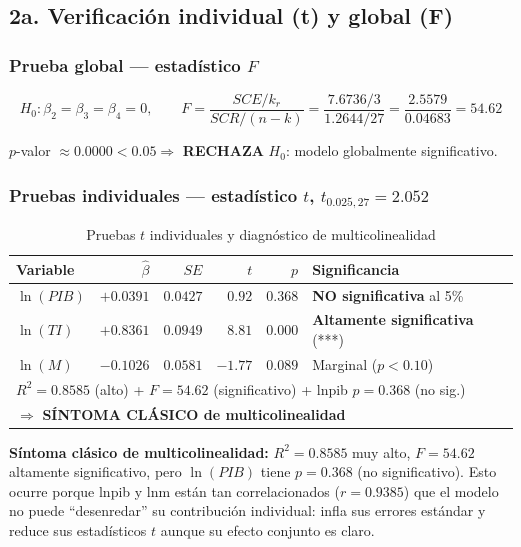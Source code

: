 \documentclass[12pt,a4paper]{article}
\begin{document}
\subsection{2a. Verificación individual (t) y global (F)}

\subsubsection{Prueba global --- estadístico $F$}

\[H_0:\beta_2=\beta_3=\beta_4=0,\qquad
F=\frac{SCE/k_r}{SCR/(n-k)}=\frac{7.6736/3}{1.2644/27}=\frac{2.5579}{0.04683}=\mathbf{54.62}\]

$p$-valor $\approx 0.0000 < 0.05 \Rightarrow$ \textbf{RECHAZA} $H_0$: modelo globalmente significativo.

\subsubsection{Pruebas individuales --- estadístico $t$, $t_{0.025,27}=2.052$}

\begin{table}[H]\centering
\caption{Pruebas $t$ individuales y diagnóstico de multicolinealidad}
\begin{tabular}{lrrrrl}
\toprule
\textbf{Variable} & $\hat\beta$ & $SE$ & $t$ & $p$ & \textbf{Significancia}\\
\midrule
$\ln(PIB)$ & $+0.0391$ & $0.0427$ & $0.92$ & $0.368$ &
  \textcolor{rojo_a}{\textbf{NO significativa}} al 5\%\\
$\ln(TI)$  & $+0.8361$ & $0.0949$ & $8.81$ & $0.000$ &
  \textcolor{verde_o}{\textbf{Altamente significativa}} (***)\\
$\ln(M)$   & $-0.1026$ & $0.0581$ & $-1.77$ & $0.089$ &
  Marginal ($p<0.10$)\\
\midrule
\multicolumn{6}{l}{\small$R^2=0.8585$ (alto) + $F=54.62$ (significativo) + lnpib $p=0.368$ (no sig.)}\\
\multicolumn{6}{l}{\small$\Rightarrow$ \textbf{SÍNTOMA CLÁSICO de multicolinealidad}}\\
\bottomrule
\end{tabular}
\end{table}

\begin{alertbox}
\textbf{Síntoma clásico de multicolinealidad:} $R^2=0.8585$ muy alto, $F=54.62$
altamente significativo, pero $\ln(PIB)$ tiene $p=0.368$ (no significativo).
Esto ocurre porque lnpib y lnm están tan correlacionados ($r=0.9385$) que el
modelo no puede ``desenredar'' su contribución individual: infla sus errores
estándar y reduce sus estadísticos $t$ aunque su efecto conjunto es claro.
\end{alertbox}
\end{document}
